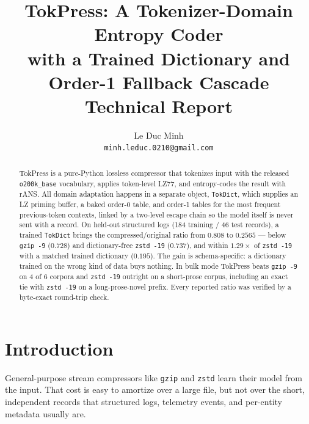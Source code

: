 \documentclass[10pt,twocolumn]{article}
\theoremstyle{plain}
\theoremstyle{definition}
\begin{document}
\title{\vspace{-1.2cm}\textbf{TokPress: A Tokenizer-Domain Entropy Coder\\
with a Trained Dictionary and Order-1 Fallback Cascade}\\[0.4em]
\large Technical Report}

\author{Le Duc Minh\\[0.25em]
\small\texttt{minh.leduc.0210@gmail.com}}
\date{}
\maketitle

\begin{abstract}
\noindent
TokPress is a pure-Python lossless compressor that tokenizes input with the
released \texttt{o200k\_base} vocabulary, applies token-level LZ77, and
entropy-codes the result with rANS. All domain adaptation happens in a separate
object, \texttt{TokDict}, which supplies an LZ priming buffer,
a baked order-0 table, and order-1 tables for the most frequent previous-token
contexts, linked by a two-level escape chain so the model itself is never sent
with a record. On held-out structured logs (184 training / 46
test records), a trained \texttt{TokDict} brings the compressed/original ratio from
$0.808$ to $\mathbf{0.2565}$ --- below \texttt{gzip -9} ($0.728$) and
dictionary-free \texttt{zstd -19} ($0.737$), and within $1.29\times$ of
\texttt{zstd -19} with a matched trained dictionary ($0.195$). The gain is
schema-specific: a dictionary trained on the wrong kind of data buys nothing. In
bulk mode TokPress beats \texttt{gzip -9} on 4 of 6 corpora and \texttt{zstd -19}
outright on a short-prose corpus, including an exact tie with \texttt{zstd -19} on a
long-prose-novel prefix. Every reported ratio was verified by a byte-exact
round-trip check.
\end{abstract}

\section{Introduction}

General-purpose stream compressors like \texttt{gzip} and \texttt{zstd} learn their
model from the input. That cost is easy to amortize over a large file, but not over
the short, independent records that structured logs, telemetry events, and per-entity
metadata usually are.
\end{document}
